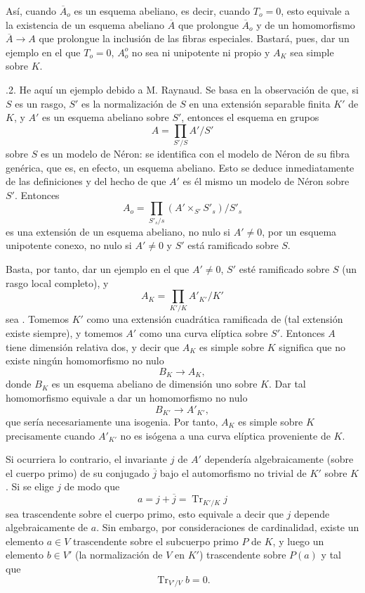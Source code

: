 Así, cuando $\overline A_o$ es un esquema abeliano, es decir, cuando
$T_o=0$, esto equivale a la existencia de un esquema abeliano
$\overline A$ que prolongue $\overline A_o$ y de un homomorfismo
$\overline A\longrightarrow A$ que prolongue la inclusión de las fibras
especiales. Bastará, pues, dar un ejemplo en el que $T_o=0$, $A_o^o$ no
sea ni unipotente ni propio y $A_K$ sea simple sobre $K$.


\medskip
{}.2. He aquí un ejemplo debido a M. Raynaud. Se basa en la observación
de que, si $S$ es un rasgo, $S'$ es la normalización de $S$ en una
extensión separable finita $K'$ de $K$, y $A'$ es un esquema abeliano
sobre $S'$, entonces el esquema en grupos
\[
 A=\prod_{S'/S} A'/S'
\]
sobre $S$ es un modelo de Néron: se identifica con el modelo de Néron de
su fibra genérica, que es, en efecto, un esquema abeliano. Esto se
deduce inmediatamente de las definiciones y del hecho de que $A'$ es él
mismo un modelo de Néron sobre $S'$. Entonces
\[
 A_o=\prod_{S'_s/s}(A'\times_{S'}S'_s)/S'_s
\]
es una extensión de un esquema abeliano, no nulo si $A'\neq0$, por un
esquema unipotente conexo, no nulo si $A'\neq0$ y $S'$ está ramificado
sobre $S$.

Basta, por tanto, dar un ejemplo en el que $A'\neq0$, $S'$ esté
ramificado sobre $S$ (un rasgo local completo), y
\[
 A_K=\prod_{K'/K}A'_{K'}/K'
\]
sea . Tomemos $K'$ como una
extensión cuadrática ramificada de  (tal extensión existe
siempre), y
tomemos $A'$ como una curva elíptica sobre $S'$. Entonces $A$ tiene
dimensión relativa dos, y decir que $A_K$ es simple sobre $K$ significa
que no existe ningún homomorfismo no nulo
\[
 B_K\longrightarrow A_K,
\]
donde $B_K$ es un esquema abeliano de dimensión uno sobre $K$. Dar tal
homomorfismo equivale a dar un homomorfismo no nulo
\[
 B_{K'}\longrightarrow A'_{K'},
\]
que sería necesariamente una isogenia. Por tanto, $A_K$ es simple
sobre $K$ precisamente cuando $A'_{K'}$ no es isógena a una curva
elíptica proveniente de $K$.

Si ocurriera lo contrario, el invariante $j$ de $A'$ dependería
algebraicamente (sobre el cuerpo primo) de su conjugado $\overline j$
bajo el automorfismo no trivial de $K'$ sobre $K$. Si se elige $j$ de
modo que
\[
 a=j+\overline j=\operatorname{Tr}_{K'/K}j
\]
sea trascendente sobre el cuerpo primo, esto equivale a decir que $j$
depende algebraicamente de $a$. Sin embargo, por consideraciones de
cardinalidad, existe un elemento $a\in V$ trascendente sobre el
subcuerpo primo $P$ de $K$, y luego un elemento $b\in V'$ (la
normalización de $V$ en $K'$) trascendente sobre $P(a)$ y tal que
\[
 \operatorname{Tr}_{V'/V}b=0.
\]

